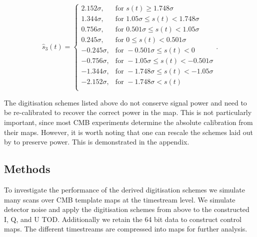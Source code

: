 \documentclass[apj]{emulateapj}
\begin{document}
\begin{equation}  \label{eq:3bit}
\hat{s}_3(t) = \left\{ \begin{array}{rl}
2.152 \sigma, & \text{for } s(t) \geq 1.748 \sigma\\
1.344 \sigma, & \text{for } 1.05 \sigma \leq s(t) < 1.748 \sigma\\
0.756 \sigma, & \text{for } 0.501 \sigma \leq s(t) < 1.05 \sigma\\
0.245 \sigma, & \text{for } 0 \leq s(t) < 0.501 \sigma\\
-0.245 \sigma, & \text{for } -0.501 \sigma \leq s(t) < 0\\
-0.756 \sigma, & \text{for } -1.05 \sigma \leq s(t) < -0.501 \sigma\\
-1.344 \sigma, & \text{for } -1.748 \sigma \leq s(t) < -1.05 \sigma\\
-2.152 \sigma, & \text{for } -1.748 \sigma < s(t)\\
\end{array} \right. . \end{equation}

The digitisation schemes listed above do not conserve signal power and need to be re-calibrated to recover the correct power in the map. This is not particularly important, since most CMB experiments determine the absolute calibration from their maps. However, it is worth noting that one can rescale the schemes laid out by \cite{max1960} to preserve power. This is demonstrated in the appendix.


\subsection{Methods}
\label{subsec:method}

To investigate the performance of the derived digitisation schemes we simulate many scans over CMB template maps at the timestream level. We simulate detector noise and apply the digitisation schemes from above to the constructed I, Q, and U TOD. Additionally we retain the 64 bit data to construct control maps. The different timestreams are compressed into maps for further analysis.
\end{document}
